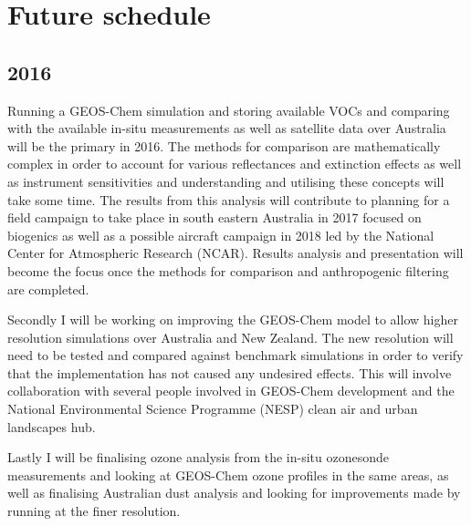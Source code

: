 \section{Future schedule}

\subsection{2016}

Running a GEOS-Chem simulation and storing available VOCs and comparing with the available in-situ measurements as well as satellite data over Australia will be the primary in 2016.
The methods for comparison are mathematically complex in order to account for various reflectances and extinction effects as well as instrument sensitivities and understanding and utilising these concepts will take some time.
The results from this analysis will contribute to planning for a field campaign to take place in south eastern Australia in 2017 focused on biogenics as well as a possible aircraft campaign in 2018 led by the National Center for Atmospheric Research (NCAR).
Results analysis and presentation will become the focus once the methods for comparison and anthropogenic filtering are completed.

Secondly I will be working on improving the GEOS-Chem model to allow higher resolution simulations over Australia and New Zealand.
The new resolution will need to be tested and compared against benchmark simulations in order to verify that the implementation has not caused any undesired effects.
This will involve collaboration with several people involved in GEOS-Chem development and the National Environmental Science Programme (NESP) clean air and urban landscapes hub.

Lastly I will be finalising ozone analysis from the in-situ ozonesonde measurements and looking at GEOS-Chem ozone profiles in the same areas, as well as finalising Australian dust analysis and looking for improvements made by running at the finer resolution.

